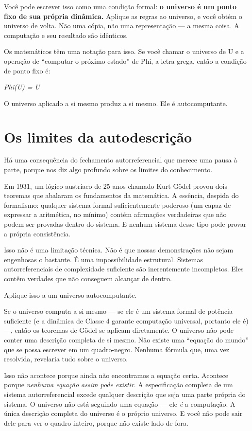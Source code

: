 \documentclass[11pt, twoside, openright]{book}
\begin{document}
Você pode escrever isso como uma condição formal: \textbf{o universo é um ponto fixo de sua própria dinâmica.} Aplique as regras ao universo, e você obtém o universo de volta. Não uma cópia, não uma representação --- a mesma coisa. A computação e seu resultado são idênticos.

Os matemáticos têm uma notação para isso. Se você chamar o universo de U e a operação de ``computar o próximo estado'' de Phi, a letra grega, então a condição de ponto fixo é:

\textit{Phi(U) = U}

O universo aplicado a si mesmo produz a si mesmo. Ele é autocomputante.


\section*{Os limites da autodescrição}

Há uma consequência do fechamento autorreferencial que merece uma pausa à parte, porque nos diz algo profundo sobre os limites do conhecimento.

Em 1931, um lógico austríaco de 25 anos chamado Kurt Gödel provou dois teoremas que abalaram os fundamentos da matemática. A essência, despida do formalismo: qualquer sistema formal suficientemente poderoso (um capaz de expressar a aritmética, no mínimo) contém afirmações verdadeiras que não podem ser provadas dentro do sistema. E nenhum sistema desse tipo pode provar a própria consistência.

Isso não é uma limitação técnica. Não é que nossas demonstrações não sejam engenhosas o bastante. É uma impossibilidade estrutural. Sistemas autorreferenciais de complexidade suficiente são inerentemente incompletos. Eles contêm verdades que não conseguem alcançar de dentro.

Aplique isso a um universo autocomputante.

Se o universo computa a si mesmo --- se ele é um sistema formal de potência suficiente (e a dinâmica de Classe 4 garante computação universal, portanto ele é) ---, então os teoremas de Gödel se aplicam diretamente. O universo não pode conter uma descrição completa de si mesmo. Não existe uma ``equação do mundo'' que se possa escrever em um quadro-negro. Nenhuma fórmula que, uma vez resolvida, revelaria tudo sobre o universo.

Isso não acontece porque ainda não encontramos a equação certa. Acontece porque \textit{nenhuma equação assim pode existir}. A especificação completa de um sistema autorreferencial excede qualquer descrição que seja uma parte própria do sistema. O universo não está seguindo uma equação --- ele \textit{é} a computação. A única descrição completa do universo é o próprio universo. E você não pode sair dele para ver o quadro inteiro, porque não existe lado de fora.
\end{document}
